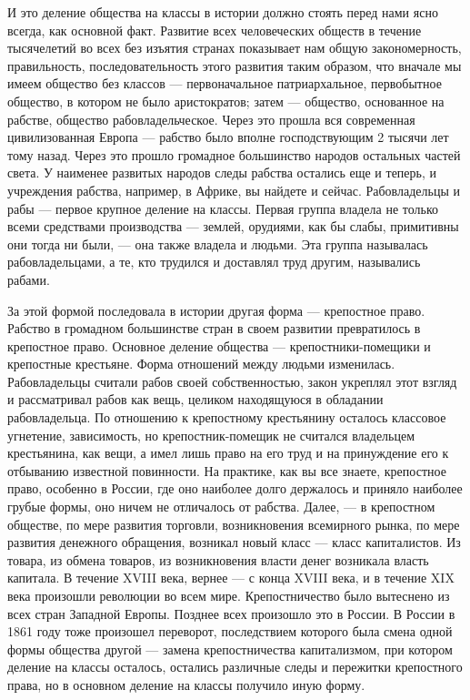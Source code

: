 \documentclass[12pt]{article}
\newcommand{\parnum}{(\arabic{parcount})}
\newcounter{parcount}
\newenvironment{parnumbers}{%
  \par%
  \everypar{\noindent \stepcounter{parcount}\marginpar[]{\parnum}}%
}{}
\begin{document}
\begin{parnumbers}
И это деление общества на классы в истории должно стоять перед нами ясно всегда, как основной факт. Развитие всех человеческих обществ в течение тысячелетий во всех без изъятия странах показывает нам общую закономерность, правильность, последовательность этого развития таким образом, что вначале мы имеем общество без классов — первоначальное патриархальное, первобытное общество, в котором не было аристократов; затем — общество, основанное на рабстве, общество рабовладельческое. Через это прошла вся современная цивилизованная Европа — рабство было вполне господствующим 2 тысячи лет тому назад. Через это прошло громадное большинство народов остальных частей света. У наименее развитых народов следы рабства остались еще и теперь, и учреждения рабства, например, в Африке, вы найдете и сейчас. Рабовладельцы и рабы — первое крупное деление на классы. Первая группа владела не только всеми средствами производства — землей, орудиями, как бы слабы, примитивны они тогда ни были, — она также владела и людьми. Эта группа называлась рабовладельцами, а те, кто трудился и доставлял труд другим, назывались рабами.

За этой формой последовала в истории другая форма — крепостное право. Рабство в громадном большинстве стран в своем развитии превратилось в крепостное право. Основное деление общества — крепостники-помещики и крепостные крестьяне. Форма отношений между людьми изменилась. Рабовладельцы считали рабов своей собственностью, закон укреплял этот взгляд и рассматривал рабов как вещь, целиком находящуюся в обладании рабовладельца. По отношению к крепостному крестьянину осталось классовое угнетение, зависимость, но крепостник-помещик не считался владельцем крестьянина, как вещи, а имел лишь право на его труд и на принуждение его к отбыванию известной повинности. На практике, как вы все знаете, крепостное право, особенно в России, где оно наиболее долго держалось и приняло наиболее грубые формы, оно ничем не отличалось от рабства. Далее, — в крепостном обществе, по мере развития торговли, возникновения всемирного рынка, по мере развития денежного обращения, возникал новый класс — класс капиталистов. Из товара, из обмена товаров, из возникновения власти денег возникала власть капитала. В течение XVIII века, вернее — с конца XVIII века, и в течение XIX века произошли революции во всем мире. Крепостничество было вытеснено из всех стран Западной Европы. Позднее всех произошло это в России. В России в 1861 году тоже произошел переворот, последствием которого была смена одной формы общества другой — замена крепостничества капитализмом, при котором деление на классы осталось, остались различные следы и пережитки крепостного права, но в основном деление на классы получило иную форму.


\end{parnumbers}
\end{document}
